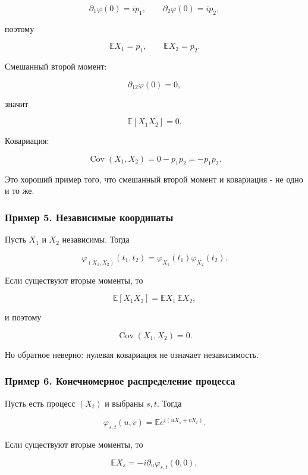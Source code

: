 \documentclass[
  11pt,
  a4paper,
]{article}
\begin{document}
\[
\partial_1\varphi(0)=ip_1,
\qquad
\partial_2\varphi(0)=ip_2,
\]

поэтому

\[
\mathbb EX_1=p_1,
\qquad
\mathbb EX_2=p_2.
\]

Смешанный второй момент:

\[
\partial_{12}\varphi(0)=0,
\]

значит

\[
\mathbb E[X_1X_2]=0.
\]

Ковариация:

\[
\operatorname{Cov}(X_1,X_2)
=
0-p_1p_2
=
-p_1p_2.
\]

Это хороший пример того, что смешанный второй момент и ковариация - не
одно и то же.

\subsubsection{Пример 5. Независимые
координаты}\label{ux43fux440ux438ux43cux435ux440-5.-ux43dux435ux437ux430ux432ux438ux441ux438ux43cux44bux435-ux43aux43eux43eux440ux434ux438ux43dux430ux442ux44b}

Пусть \(X_1\) и \(X_2\) независимы. Тогда

\[
\varphi_{(X_1,X_2)}(t_1,t_2)
=
\varphi_{X_1}(t_1)\varphi_{X_2}(t_2).
\]

Если существуют вторые моменты, то

\[
\mathbb E[X_1X_2]
=
\mathbb EX_1\,\mathbb EX_2,
\]

и поэтому

\[
\operatorname{Cov}(X_1,X_2)=0.
\]

Но обратное неверно: нулевая ковариация не означает независимость.

\subsubsection{Пример 6. Конечномерное распределение
процесса}\label{ux43fux440ux438ux43cux435ux440-6.-ux43aux43eux43dux435ux447ux43dux43eux43cux435ux440ux43dux43eux435-ux440ux430ux441ux43fux440ux435ux434ux435ux43bux435ux43dux438ux435-ux43fux440ux43eux446ux435ux441ux441ux430}

Пусть есть процесс \((X_t)\) и выбраны \(s,t\). Тогда

\[
\varphi_{s,t}(u,v)
=
\mathbb E e^{i(uX_s+vX_t)}.
\]

Если существуют вторые моменты, то

\[
\mathbb EX_s=-i\partial_u\varphi_{s,t}(0,0),
\]
\end{document}
